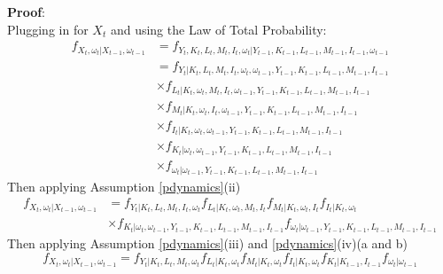 \documentclass{article}
\begin{document}
\noindent \textbf{Proof}:\\
\noindent Plugging in for $X_{t}$ and using the Law of Total Probability:
\begin{equation*}
\begin{split}
f_{X_{t}, \omega_{t}|X_{t-1}, \omega_{t-1}}&=f_{Y_{t}, K_{t}, L_{t}, M_{t}, I_{t}, \omega_{t}|Y_{t-1}, K_{t-1}, L_{t-1}, M_{t-1}, I_{t-1}, \omega_{t-1}}\\
&= f_{Y_{t}|K_{t}, L_{t}, M_{t}, I_{t}, \omega_{t}, \omega_{t-1}, Y_{t-1}, K_{t-1}, L_{t-1}, M_{t-1}, I_{t-1}}\\
&\times f_{L_{t}|K_{t}, \omega_{t}, M_{t}, I_{t}, \omega_{t-1},  Y_{t-1}, K_{t-1}, L_{t-1}, M_{t-1}, I_{t-1}}\\
&\times f_{M_{t}|K_{t}, \omega_{t}, I_{t}, \omega_{t-1},  Y_{t-1}, K_{t-1}, L_{t-1}, M_{t-1}, I_{t-1}}\\
&\times f_{I_{t}|K_{t}, \omega_{t}, \omega_{t-1},  Y_{t-1}, K_{t-1}, L_{t-1}, M_{t-1}, I_{t-1}}\\
&\times f_{K_{t}|\omega_{t}, \omega_{t-1},  Y_{t-1}, K_{t-1}, L_{t-1}, M_{t-1}, I_{t-1}}\\
& \times f_{\omega_{t}|\omega_{t-1},  Y_{t-1}, K_{t-1}, L_{t-1}, M_{t-1}, I_{t-1}}
\end{split}
\end{equation*}
Then applying Assumption \eqref{pdynamics}(ii)
\begin{equation*}
\begin{split}
f_{X_{t}, \omega_{t}|X_{t-1}, \omega_{t-1}}&= f_{Y_{t}|K_{t}, L_{t}, M_{t}, I_{t}, \omega_{t}}f_{L_{t}|K_{t}, \omega_{t}, M_{t}, I_{t}}f_{M_{t}|K_{t}, \omega_{t}, I_{t}}f_{I_{t}|K_{t}, \omega_{t}}\\
&\times f_{K_{t}|\omega_{t}, \omega_{t-1},  Y_{t-1}, K_{t-1}, L_{t-1}, M_{t-1}, I_{t-1}}f_{\omega_{t}|\omega_{t-1},  Y_{t-1}, K_{t-1}, L_{t-1}, M_{t-1}, I_{t-1}}
\end{split}
\end{equation*}
Then applying Assumption \eqref{pdynamics}(iii) and \eqref{pdynamics}(iv)(a and b)
\begin{equation*}
f_{X_{t}, \omega_{t}|X_{t-1}, \omega_{t-1}}= f_{Y_{t}|K_{t}, L_{t}, M_{t}, \omega_{t}}f_{L_{t}|K_{t}, \omega_{t}}f_{M_{t}|K_{t}, \omega_{t}}f_{I_{t}|K_{t}, \omega_{t}}f_{K_{t}|K_{t-1}, I_{t-1}}f_{\omega_{t}|\omega_{t-1}}
\end{equation*}
\end{document}
